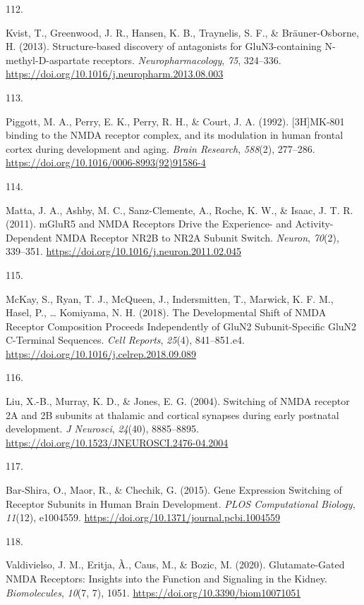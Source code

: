 \documentclass[
  11pt,
  letterpaper,
]{scrreprt}
\newlength{\cslhangindent}
\newlength{\csllabelwidth}
\newenvironment{CSLReferences}[2] %
 {\begin{list}{}{%
  \setlength{\itemindent}{0pt}
  \setlength{\leftmargin}{0pt}
  \setlength{\parsep}{0pt}
  \ifodd #1
   \setlength{\leftmargin}{\cslhangindent}
   \setlength{\itemindent}{-1\cslhangindent}
  \fi
  \setlength{\itemsep}{#2\baselineskip}}}
 {\end{list}}
\newcommand{\CSLLeftMargin}[1]{\parbox[t]{\csllabelwidth}{\strut#1\strut}}
\newcommand{\CSLRightInline}[1]{\parbox[t]{\linewidth - \csllabelwidth}{\strut#1\strut}}
\begin{document}
\begin{CSLReferences}{0}{0}
\CSLLeftMargin{112. }%
\CSLRightInline{Kvist, T., Greenwood, J. R., Hansen, K. B., Traynelis,
S. F., \& Bräuner-Osborne, H. (2013). Structure-based discovery of
antagonists for {GluN3-containing N-methyl-D-aspartate} receptors.
\emph{Neuropharmacology}, \emph{75}, 324--336.
\url{https://doi.org/10.1016/j.neuropharm.2013.08.003}}

\CSLLeftMargin{113. }%
\CSLRightInline{Piggott, M. A., Perry, E. K., Perry, R. H., \& Court, J.
A. (1992). {[}{3H}{]}{MK-801} binding to the {NMDA} receptor complex,
and its modulation in human frontal cortex during development and aging.
\emph{Brain Research}, \emph{588}(2), 277--286.
\url{https://doi.org/10.1016/0006-8993(92)91586-4}}

\CSLLeftMargin{114. }%
\CSLRightInline{Matta, J. A., Ashby, M. C., Sanz-Clemente, A., Roche, K.
W., \& Isaac, J. T. R. (2011). {mGluR5} and {NMDA Receptors Drive} the
{Experience-} and {Activity-Dependent NMDA Receptor NR2B} to {NR2A
Subunit Switch}. \emph{Neuron}, \emph{70}(2), 339--351.
\url{https://doi.org/10.1016/j.neuron.2011.02.045}}

\CSLLeftMargin{115. }%
\CSLRightInline{McKay, S., Ryan, T. J., McQueen, J., Indersmitten, T.,
Marwick, K. F. M., Hasel, P., \ldots{} Komiyama, N. H. (2018). The
{Developmental Shift} of {NMDA Receptor Composition Proceeds
Independently} of {GluN2 Subunit-Specific GluN2 C-Terminal Sequences}.
\emph{Cell Reports}, \emph{25}(4), 841--851.e4.
\url{https://doi.org/10.1016/j.celrep.2018.09.089}}

\CSLLeftMargin{116. }%
\CSLRightInline{Liu, X.-B., Murray, K. D., \& Jones, E. G. (2004).
Switching of {NMDA} receptor {2A} and {2B} subunits at thalamic and
cortical synapses during early postnatal development. \emph{J Neurosci},
\emph{24}(40), 8885--8895.
\url{https://doi.org/10.1523/JNEUROSCI.2476-04.2004}}

\CSLLeftMargin{117. }%
\CSLRightInline{Bar-Shira, O., Maor, R., \& Chechik, G. (2015). Gene
{Expression Switching} of {Receptor Subunits} in {Human Brain
Development}. \emph{PLOS Computational Biology}, \emph{11}(12),
e1004559. \url{https://doi.org/10.1371/journal.pcbi.1004559}}

\CSLLeftMargin{118. }%
\CSLRightInline{Valdivielso, J. M., Eritja, À., Caus, M., \& Bozic, M.
(2020). Glutamate-{Gated NMDA Receptors}: {Insights} into the {Function}
and {Signaling} in the {Kidney}. \emph{Biomolecules}, \emph{10}(7, 7),
1051. \url{https://doi.org/10.3390/biom10071051}}


\end{CSLReferences}
\end{document}

